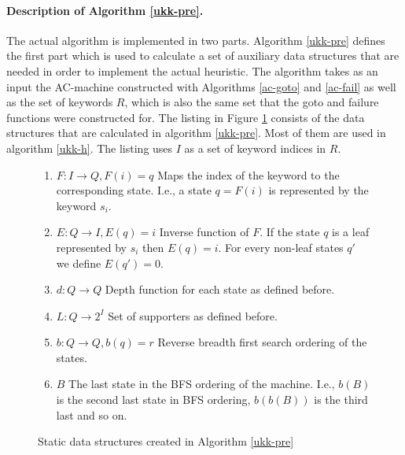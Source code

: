 \documentclass[english,twoside,censored,csm,algorithms-track-2020]{HYthesisML}
\theoremstyle{plain}
\theoremstyle{definition}
\begin{document}
\paragraph{Description of Algorithm \ref{ukk-pre}.}
The actual algorithm is implemented in two parts. Algorithm \ref{ukk-pre} defines the first part
which is used to calculate a set of auxiliary data structures that are needed in order to implement
the actual heuristic. The algorithm takes as an input the AC-machine constructed with
Algorithms \ref{ac-goto} and \ref{ac-fail} as well as the set of keywords $R$, which is also
the same set that the goto and failure functions were constructed for. 
The listing in Figure \ref{lst-auxiliary-data} consists of the data structures that are calculated
in algorithm \ref{ukk-pre}. Most of them are used in algorithm \ref{ukk-h}. The listing uses $I$ as
a set of keyword indices in $R$.

\begin{figure}[hb]
\begin{enumerate}
  \item $F : I \rightarrow Q, F(i)=q$ Maps the index of the keyword to the corresponding state. I.e., a state $q=F(i)$ is represented by the keyword $s_i$.
  \item $E : Q \rightarrow I, E(q)=i$ Inverse function of $F$. If the state $q$ is a leaf represented by $s_i$ then $E(q)=i$. For every non-leaf states $q'$ we define $E(q')=0$.
  \item $d : Q \rightarrow Q$ Depth function for each state as defined before.
  \item $L : Q \rightarrow 2^{I}$ Set of supporters as defined before.
  \item $b : Q \rightarrow Q, b(q)=r$ Reverse breadth first search ordering of the states.
  \item $B$ The last state in the BFS ordering of the machine. I.e., $b(B)$ is the second last state in BFS ordering, $b(b(B))$ is the third last and so on.
\end{enumerate}
\caption{Static data structures created in Algorithm \ref{ukk-pre}} \label{lst-auxiliary-data}
\end{figure}
\end{document}
